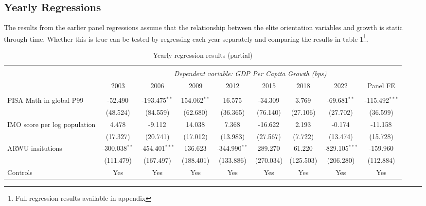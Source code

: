 \documentclass[11pt]{article}
\begin{document}
\subsection{Yearly Regressions}
The results from the earlier panel regressions assume that the relationship between the elite orientation variables and growth is static through time. Whether this is true can be tested by regressing each year separately and comparing the results in table \ref{table:yearly}\footnote{Full regression results available in appendix}.
\begin{table}[H] \centering
    \caption{Yearly regression results (partial)}
    \label{table:yearly}
    \resizebox{\linewidth}{!} {
        \begin{tabular}{@{\extracolsep{1pt}}lcccccccc}
            \\[-1.8ex]\hline
            \hline \\[-1.8ex]
            & \multicolumn{8}{c}{\textit{Dependent variable: GDP Per Capita Growth (bps)}} \
            \cr \cline{2-9}
            \\[-1.8ex] & \multicolumn{1}{c}{2003} & \multicolumn{1}{c}{2006} & \multicolumn{1}{c}{2009} & \multicolumn{1}{c}{2012} & \multicolumn{1}{c}{2015} & \multicolumn{1}{c}{2018} & \multicolumn{1}{c}{2022} & \multicolumn{1}{c}{Panel FE}  \\
            \hline \\[-1.8ex]
             PISA Math in global P99 & -52.490$^{}$ & -193.475$^{**}$ & 154.062$^{**}$ & 16.575$^{}$ & -34.309$^{}$ & 3.769$^{}$ & -69.681$^{**}$ & -115.492$^{***}$ \\
            & (48.524) & (84.559) & (62.680) & (36.365) & (76.140) & (27.106) & (27.702) & (36.599) \\
             IMO score per log population & 4.478$^{}$ & -9.112$^{}$ & 14.038$^{}$ & 7.368$^{}$ & -16.622$^{}$ & 2.193$^{}$ & -0.174$^{}$ & -11.158$^{}$ \\
            & (17.327) & (20.741) & (17.012) & (13.983) & (27.567) & (7.722) & (13.474) & (15.728) \\
             ARWU insitutions & -300.038$^{**}$ & -454.401$^{***}$ & 136.623$^{}$ & -344.990$^{**}$ & 289.270$^{}$ & 61.220$^{}$ & -829.105$^{***}$ & -159.960$^{}$ \\
            & (111.479) & (167.497) & (188.401) & (133.886) & (270.034) & (125.503) & (206.280) & (112.884) \\
            Controls & Yes & Yes & Yes & Yes & Yes & Yes & Yes & Yes \\

\end{tabular}}
\end{table}
\end{document}

